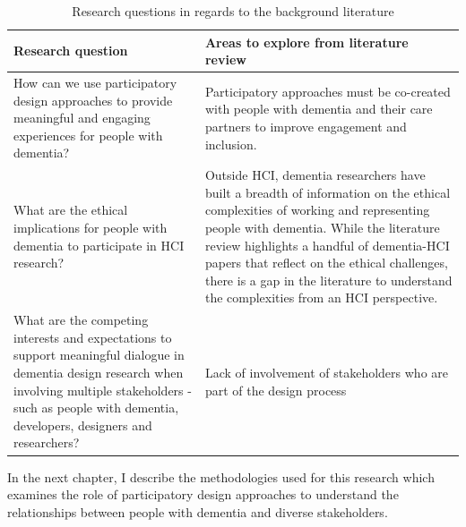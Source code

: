 \begin{table}[htp]
\caption{Research questions in regards to the background literature}
\label{BL:RQ}
\begin{tabularx}{\textwidth}{@{} Y|Y @{}}
\textbf{Research question} & \textbf{Areas to explore from literature review}  \\ \hline
How can we use participatory design approaches to provide meaningful and engaging experiences for people with dementia? & Participatory approaches must be co-created with people with dementia and their care partners to improve engagement and inclusion.  \\ \hline
What are the ethical implications for people with dementia to participate in HCI research? & Outside HCI, dementia researchers have built a breadth of information on the ethical complexities of working and representing people with dementia. While the literature review highlights a handful of dementia-HCI papers that reflect on the ethical challenges, there is a gap in the literature to understand the complexities from an HCI perspective.
  \\ \hline
What are the competing interests and expectations to support meaningful dialogue in dementia design research when involving multiple stakeholders - such as people with dementia, developers, designers and researchers? & Lack of involvement of stakeholders who are part of the design process  \\ \hline
\end{tabularx}
\end{table}


In the next chapter, I describe the methodologies used for this research which examines the role of participatory design approaches to understand the relationships between people with dementia and diverse stakeholders.
